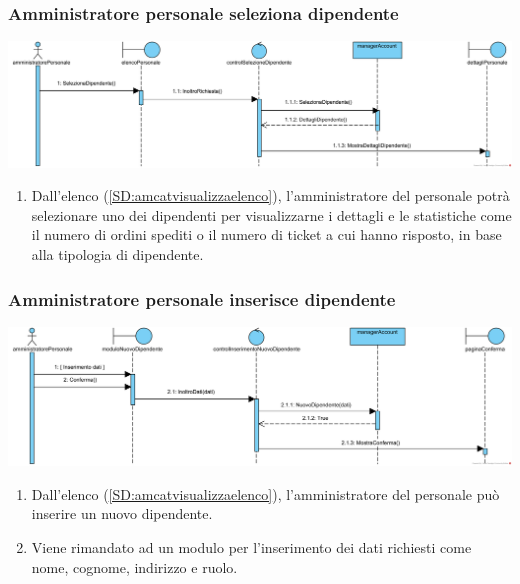 \documentclass[12pt,a4paper]{article}
\begin{document}
\subsubsection{Amministratore personale seleziona dipendente}
\label{SD:amperselezione}
\begin{center}
\includegraphics[width=\textwidth]{SequenceDiagram/AmministratorePersonaleDipendenteSeleziona}
\end{center}

\begin{enumerate}
\item Dall'elenco (\ref{SD:amcatvisualizzaelenco}), l'amministratore del personale potrà selezionare uno dei dipendenti per visualizzarne i dettagli e le statistiche come il numero di ordini spediti o il numero di ticket a cui hanno risposto, in base alla tipologia di dipendente.
\end{enumerate}

\subsubsection{Amministratore personale inserisce dipendente}
\label{SD:amperinserisce}
\begin{center}
\includegraphics[width=\textwidth]{SequenceDiagram/AmministratorePersonaleDipendenteInserisce}
\end{center}

\begin{enumerate}
\item Dall'elenco (\ref{SD:amcatvisualizzaelenco}), l'amministratore del personale può inserire un nuovo dipendente.
\item Viene rimandato ad un modulo per l'inserimento dei dati richiesti come nome, cognome, indirizzo e ruolo.
\end{enumerate}
\end{document}
